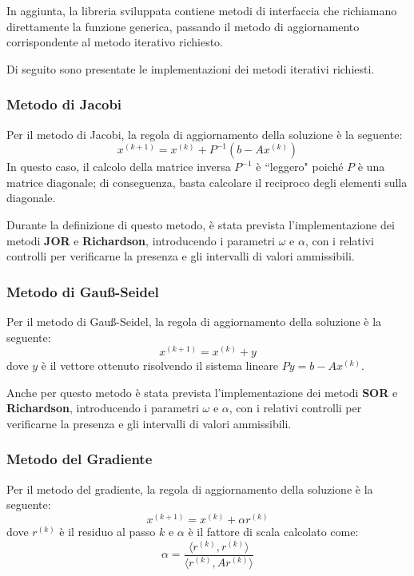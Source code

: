 In aggiunta, la libreria sviluppata contiene metodi di interfaccia che richiamano 
direttamente la funzione generica, passando il metodo di aggiornamento corrispondente 
al metodo iterativo richiesto.

Di seguito sono presentate le implementazioni dei metodi iterativi richiesti.
\subsubsection{Metodo di Jacobi}
Per il metodo di Jacobi, la regola di aggiornamento della soluzione è la seguente:
\begin{equation}
    x^{(k+1)} = x^{(k)} + P^{-1}(b - Ax^{(k)})
\end{equation}
In questo caso, il calcolo della matrice inversa $P^{-1}$ è ``leggero" poiché $P$
è una matrice diagonale; di conseguenza, basta calcolare il reciproco degli
elementi sulla diagonale.

Durante la definizione di questo metodo, è stata prevista l'implementazione dei
metodi \textbf{JOR} e \textbf{Richardson}, introducendo i parametri $\omega$ e
$\alpha$, con i relativi controlli per verificarne la presenza e gli intervalli
di valori ammissibili.
\subsubsection{Metodo di Gauß-Seidel}
Per il metodo di Gauß-Seidel, la regola di aggiornamento della soluzione è la seguente:
\begin{equation}
    x^{(k+1)} = x^{(k)} + y
\end{equation}
dove $y$ è il vettore ottenuto risolvendo il sistema lineare $Py = b - Ax^{(k)}$.

Anche per questo metodo è stata prevista l'implementazione dei metodi \textbf{SOR}
e \textbf{Richardson}, introducendo i parametri $\omega$ e $\alpha$, con i relativi
controlli per verificarne la presenza e gli intervalli di valori ammissibili.

\subsubsection{Metodo del Gradiente}
Per il metodo del gradiente, la regola di aggiornamento della soluzione è la seguente:
\begin{equation}
    x^{(k+1)} = x^{(k)} + \alpha r^{(k)}
\end{equation}
dove $r^{(k)}$ è il residuo al passo $k$ e $\alpha$ è il fattore di scala calcolato
come:
\begin{equation}
    \alpha = \frac{\langle r^{(k)}, r^{(k)}\rangle}{\langle r^{(k)}, Ar^{(k)}\rangle}
\end{equation}

